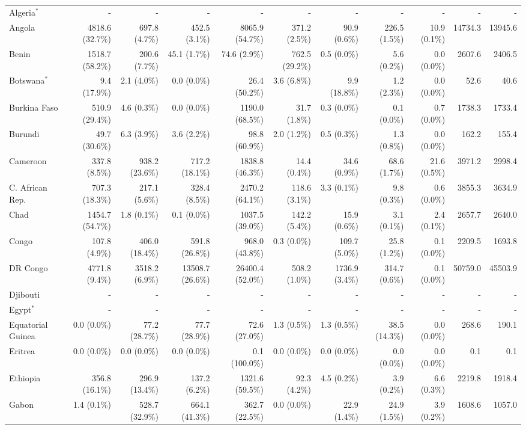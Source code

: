 \begin{scriptsize}
\begin{landscape}
\begin{center}
\begin{longtable}[ht]{lrrrrrrrrrr}
			Algeria$^*$&-&-&-&-&-&-&-&-&-&-\\
			Angola&4818.6 (32.7\%)&697.8 (4.7\%)&452.5 (3.1\%)&8065.9 (54.7\%)&371.2 (2.5\%)&90.9 (0.6\%)&226.5 (1.5\%)&10.9 (0.1\%)&14734.3&13945.6\\
			Benin&1518.7 (58.2\%)&200.6 (7.7\%)&45.1 (1.7\%)&74.6 (2.9\%)&762.5 (29.2\%)&0.5 (0.0\%)&5.6 (0.2\%)&0.0 (0.0\%)&2607.6&2406.5\\
			Botswana$^*$&9.4 (17.9\%)&2.1 (4.0\%)&0.0 (0.0\%)&26.4 (50.2\%)&3.6 (6.8\%)&9.9 (18.8\%)&1.2 (2.3\%)&0.0 (0.0\%)&52.6&40.6\\
			Burkina Faso&510.9 (29.4\%)&4.6 (0.3\%)&0.0 (0.0\%)&1190.0 (68.5\%)&31.7 (1.8\%)&0.3 (0.0\%)&0.1 (0.0\%)&0.7 (0.0\%)&1738.3&1733.4\\
			Burundi&49.7 (30.6\%)&6.3 (3.9\%)&3.6 (2.2\%)&98.8 (60.9\%)&2.0 (1.2\%)&0.5 (0.3\%)&1.3 (0.8\%)&0.0 (0.0\%)&162.2&155.4\\
			Cameroon&337.8 (8.5\%)&938.2 (23.6\%)&717.2 (18.1\%)&1838.8 (46.3\%)&14.4 (0.4\%)&34.6 (0.9\%)&68.6 (1.7\%)&21.6 (0.5\%)&3971.2&2998.4\\
			C. African Rep.&707.3 (18.3\%)&217.1 (5.6\%)&328.4 (8.5\%)&2470.2 (64.1\%)&118.6 (3.1\%)&3.3 (0.1\%)&9.8 (0.3\%)&0.6 (0.0\%)&3855.3&3634.9\\
			Chad&1454.7 (54.7\%)&1.8 (0.1\%)&0.1 (0.0\%)&1037.5 (39.0\%)&142.2 (5.4\%)&15.9 (0.6\%)&3.1 (0.1\%)&2.4 (0.1\%)&2657.7&2640.0\\
			Congo&107.8 (4.9\%)&406.0 (18.4\%)&591.8 (26.8\%)&968.0 (43.8\%)&0.3 (0.0\%)&109.7 (5.0\%)&25.8 (1.2\%)&0.1 (0.0\%)&2209.5&1693.8\\
			DR Congo&4771.8 (9.4\%)&3518.2 (6.9\%)&13508.7 (26.6\%)&26400.4 (52.0\%)&508.2 (1.0\%)&1736.9 (3.4\%)&314.7 (0.6\%)&0.1 (0.0\%)&50759.0&45503.9\\
			Djibouti&-&-&-&-&-&-&-&-&-&-\\
			Egypt$^*$&-&-&-&-&-&-&-&-&-&-\\
			Equatorial Guinea&0.0 (0.0\%)&77.2 (28.7\%)&77.7 (28.9\%)&72.6 (27.0\%)&1.3 (0.5\%)&1.3 (0.5\%)&38.5 (14.3\%)&0.0 (0.0\%)&268.6&190.1\\
			Eritrea&0.0 (0.0\%)&0.0 (0.0\%)&0.0 (0.0\%)&0.1 (100.0\%)&0.0 (0.0\%)&0.0 (0.0\%)&0.0 (0.0\%)&0.0 (0.0\%)&0.1&0.1\\
			Ethiopia&356.8 (16.1\%)&296.9 (13.4\%)&137.2 (6.2\%)&1321.6 (59.5\%)&92.3 (4.2\%)&4.5 (0.2\%)&3.9 (0.2\%)&6.6 (0.3\%)&2219.8&1918.4\\
			Gabon&1.4 (0.1\%)&528.7 (32.9\%)&664.1 (41.3\%)&362.7 (22.5\%)&0.0 (0.0\%)&22.9 (1.4\%)&24.9 (1.5\%)&3.9 (0.2\%)&1608.6&1057.0\\

\end{longtable}
\end{center}
\end{landscape}
\end{scriptsize}
